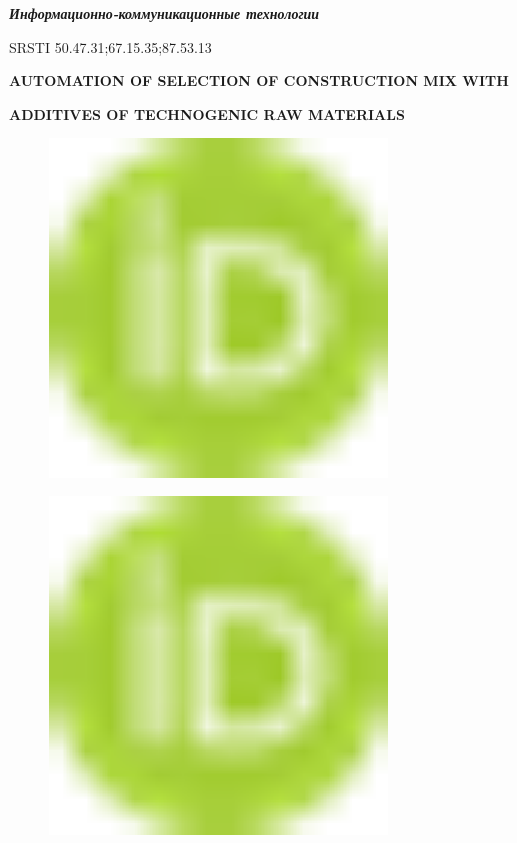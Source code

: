 \emph{{\bfseries Информационно-коммуникационные технологии}}

SRSTI 50.47.31;67.15.35;87.53.13

{\bfseries AUTOMATION OF SELECTION OF CONSTRUCTION MIX WITH}

{\bfseries ADDITIVES OF TECHNOGENIC RAW MATERIALS}

\begin{figure}[H]
	\centering
	\includegraphics[width=0.8\textwidth]{media/ict3/image1}
	\caption*{}
\end{figure}

\begin{figure}[H]
	\centering
	\includegraphics[width=0.8\textwidth]{media/ict3/image1}
	\caption*{}
\end{figure}


